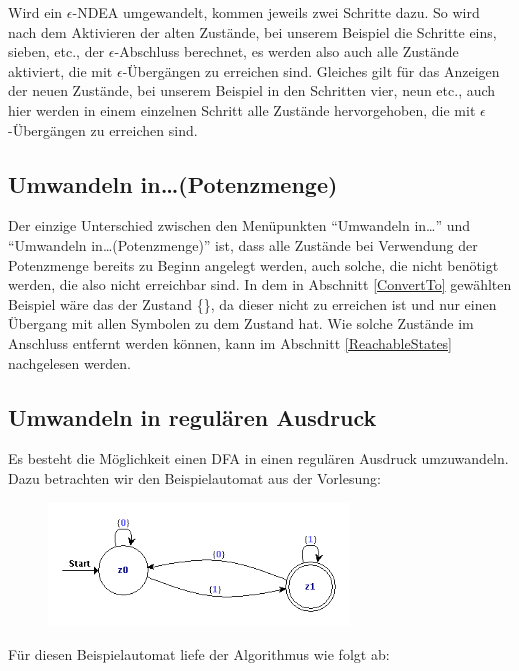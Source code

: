 Wird ein $\epsilon$-NDEA umgewandelt, kommen jeweils zwei Schritte dazu. So wird
nach dem Aktivieren der alten Zustände, bei unserem Beispiel die Schritte eins,
sieben, etc., der $\epsilon$-Abschluss berechnet, es werden also auch alle
Zustände aktiviert, die mit $\epsilon$-Übergängen zu erreichen sind. Gleiches
gilt für das Anzeigen der neuen Zustände, bei unserem Beispiel in den Schritten
vier, neun etc., auch hier werden in einem einzelnen Schritt alle Zustände
hervorgehoben, die mit $\epsilon$-Übergängen zu erreichen sind.


\subsection{Umwandeln in\ldots (Potenzmenge)}
Der einzige Unterschied zwischen den Menüpunkten "`Umwandeln in\ldots"' und
"`Umwandeln in\ldots (Potenzmenge)"' ist, dass alle Zustände bei Verwendung der
Potenzmenge bereits zu Beginn angelegt werden, auch solche, die nicht benötigt
werden, die also nicht erreichbar sind. In dem in Abschnitt \ref{ConvertTo}
gewählten Beispiel wäre das der Zustand \{\}, da dieser nicht zu
erreichen ist und nur einen Übergang mit allen Symbolen zu dem Zustand
\State{$\emptyset$} hat. Wie solche Zustände im Anschluss entfernt werden können,
kann im Abschnitt \ref{ReachableStates} nachgelesen werden.


\subsection{Umwandeln in regulären Ausdruck}

Es besteht die Möglichkeit einen DFA in einen regulären Ausdruck umzuwandeln.
Dazu betrachten wir den Beispielautomat aus der Vorlesung:

\begin{figure}[h]
\begin{center}
\includegraphics[width=8cm]{../images/dfa_for_regex.png}
\end{center}
\end{figure}

Für diesen Beispielautomat liefe der Algorithmus wie folgt ab:

